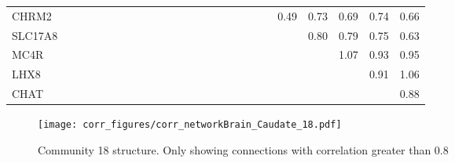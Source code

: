 \begin{longtable}{lrrrrrrrrrrrrrrrrrrrrrrrr}
CHRM2    &             &             &             &              &             &              &              &               &             &             &            &            &             &                &             &            &            &            &             &          0.49 &       0.73 &       0.69 &       0.74 &          0.66 \\
SLC17A8  &             &             &             &              &             &              &              &               &             &             &            &            &             &                &             &            &            &            &             &               &       0.80 &       0.79 &       0.75 &          0.63 \\
MC4R     &             &             &             &              &             &              &              &               &             &             &            &            &             &                &             &            &            &            &             &               &            &       1.07 &       0.93 &          0.95 \\
LHX8     &             &             &             &              &             &              &              &               &             &             &            &            &             &                &             &            &            &            &             &               &            &            &       0.91 &          1.06 \\
CHAT     &             &             &             &              &             &              &              &               &             &             &            &            &             &                &             &            &            &            &             &               &            &            &            &          0.88 \\
\end{longtable}


\begin{figure}[h!]
\centering
\texttt{[image: corr\_figures/corr\_networkBrain\_Caudate\_18.pdf]}
\caption{Community 18 structure. Only showing connections with correlation greater than 0.8}
\end{figure}





